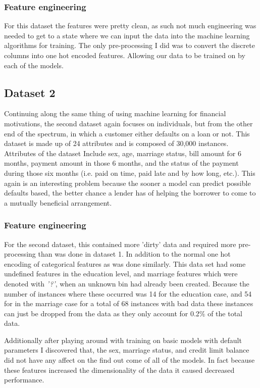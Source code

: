 \documentclass[
	letterpaper, %
]{IEEEtran}
\begin{document}
	\subsubsection{Feature engineering}
	For this dataset the features were pretty clean, as such not much engineering was needed to get to a state where we can input the data into the machine learning algorithms for training. The only pre-processing I did was to convert the discrete columns into one hot encoded features. Allowing our data to be trained on by each of the models. 
	
	\subsection{Dataset 2}
	Continuing along the same thing of using machine learning for financial motivations, the second dataset again focuses on individuals, but from the other end of the spectrum, in which a customer either defaults on a loan or not. This dataset is made up of 24 attributes and is composed of 30,000 instances. Attributes of the dataset Include sex, age, marriage status, bill amount for 6 months, payment amount in those 6 months, and the status of the payment during those six months (i.e. paid on time, paid late and by how long, etc.). This again is an interesting problem because the sooner a model can predict possible defaults based, the better chance a lender has of helping the borrower to come to a mutually beneficial arrangement.
	
	\subsubsection{Feature engineering}
	For the second dataset, this contained more 'dirty' data and required more pre-processing than was done in dataset 1. In addition to the normal one hot encoding of categorical features as was done similarly. This data set had some undefined features in the education level, and marriage features which were denoted with \emph{'?'}, when an unknown bin had already been created. Because the number of instances where these occurred was 14 for the education case, and 54 for in the marriage case for a total of 68 instances with bad data these instances can just be dropped from the data as they only account for 0.2\% of the total data.
	
	Additionally after playing around with training on basic models with default parameters I discovered that, the sex, marriage status, and credit limit balance did not have any affect on the find out come of all of the models. In fact because these features increased the dimensionality of the data it caused decreased performance.
	
\end{document}
